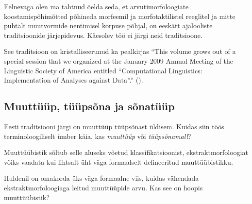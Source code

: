 \documentclass[12pt,a4paper]{article}
\begin{document}
Eelnevaga olen ma tahtnud öelda seda, et arvutimorfoloogiate koostamis\-põhimõtted põhineda morfeemil ja morfotaktilistel reeglitel ja mitte puhtalt muutvormide nentimisel korpuse põhjal, on eeskätt ajalooliste traditsioonide järjepidevus. Käesolev töö ei järgi neid traditsioone.

See traditsioon on kristalliseerunud ka pealkirjas ``This volume grows out of a special session that we organized at the January 2009 Annual Meeting of the Linguistic Society of America entitled ``Computational Linguistics: Implementation of Analyses against Data''.'' (\cite{bender_computational_2010}).





\subsection{Muuttüüp, tüüpsõna ja sõnatüüp}


Eesti traditsiooni järgi on muuttüüp tüüpsõnast üldisem. Kuidas siin töös terminoloogiliselt ümber käia, kas \textit{muuttüüp} või \textit{tüüpsõna\-mall}?

Muuttüübistik sõltub selle aluseks võetud klassifikatsioonist, ekstrakt\-morfoloogiat võiks vaadata kui lihtsalt üht väga formaalselt defineeritud muuttüübistikku.

Huldenil on omakorda üks väga formaalne viis, kuidas vähendada ekstrakt\-morfoloogiaga leitud muuttüüpide arvu. Kas see on hoopis muuttüübistik?
\end{document}
